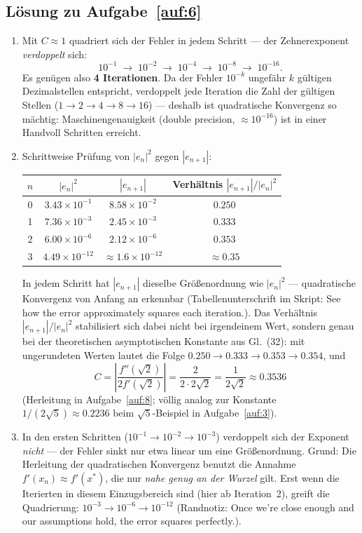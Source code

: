 \documentclass[a4paper,11pt]{scrartcl}
\begin{document}
\subsection*{Lösung zu Aufgabe~\ref{auf:6}}

\begin{enumerate}[label=(\alph*)]
  \item Mit $C \approx 1$ quadriert sich der Fehler in jedem Schritt --- der
  Zehnerexponent \emph{verdoppelt} sich:
  \[ 10^{-1} \;\to\; 10^{-2} \;\to\; 10^{-4} \;\to\; 10^{-8} \;\to\; 10^{-16}. \]
  Es genügen also \textbf{4 Iterationen}. Da der Fehler $10^{-k}$ ungefähr $k$ gültigen
  Dezimalstellen entspricht, verdoppelt jede Iteration die Zahl der gültigen Stellen
  ($1 \to 2 \to 4 \to 8 \to 16$) --- deshalb ist quadratische Konvergenz so mächtig:
  Maschinengenauigkeit (double precision, $\approx 10^{-16}$) ist in einer Handvoll
  Schritten erreicht.
  \item Schrittweise Prüfung von $|e_n|^2$ gegen $|e_{n+1}|$:
  \begin{center}
  \begin{tabular}{cccc}
    \toprule
    $n$ & $|e_n|^2$ & $|e_{n+1}|$ & Verhältnis $|e_{n+1}| / |e_n|^2$\\
    \midrule
    0 & $3.43 \times 10^{-1}$ & $8.58 \times 10^{-2}$ & $0.250$\\
    1 & $7.36 \times 10^{-3}$ & $2.45 \times 10^{-3}$ & $0.333$\\
    2 & $6.00 \times 10^{-6}$ & $2.12 \times 10^{-6}$ & $0.353$\\
    3 & $4.49 \times 10^{-12}$ & $\approx 1.6 \times 10^{-12}$ & $\approx 0.35$\\
    \bottomrule
  \end{tabular}
  \end{center}
  In jedem Schritt hat $|e_{n+1}|$ dieselbe Größenordnung wie $|e_n|^2$ ---
  quadratische Konvergenz von Anfang an erkennbar (Tabellenunterschrift im Skript:
  \glqq See how the error approximately squares each iteration.\grqq). Das Verhältnis
  $|e_{n+1}| / |e_n|^2$ stabilisiert sich dabei nicht bei irgendeinem Wert, sondern
  genau bei der theoretischen asymptotischen Konstante aus Gl.~(32): mit ungerundeten
  Werten lautet die Folge $0.250 \to 0.333 \to 0.353 \to 0.354$, und
  \[ C = \left|\frac{f''(\sqrt{2})}{2 f'(\sqrt{2})}\right|
     = \frac{2}{2 \cdot 2\sqrt{2}} = \frac{1}{2\sqrt{2}} \approx 0.3536 \]
  (Herleitung in Aufgabe~\ref{auf:8}; völlig analog zur Konstante
  $1/(2\sqrt{5}) \approx 0.2236$ beim $\sqrt{5}$-Beispiel in
  Aufgabe~\ref{auf:3}).
  \item In den ersten Schritten ($10^{-1} \to 10^{-2} \to 10^{-3}$) verdoppelt sich der
  Exponent \emph{nicht} --- der Fehler sinkt nur etwa linear um eine Größenordnung.
  Grund: Die Herleitung der quadratischen Konvergenz benutzt die Annahme
  $f'(x_n) \approx f'(x^*)$, die nur \emph{nahe genug an der Wurzel} gilt. Erst wenn
  die Iterierten in diesem Einzugsbereich sind (hier ab Iteration~2), greift die
  Quadrierung: $10^{-3} \to 10^{-6} \to 10^{-12}$ (Randnotiz: \glqq Once we're close
  enough and our assumptions hold, the error squares perfectly.\grqq).
\end{enumerate}
\end{document}
